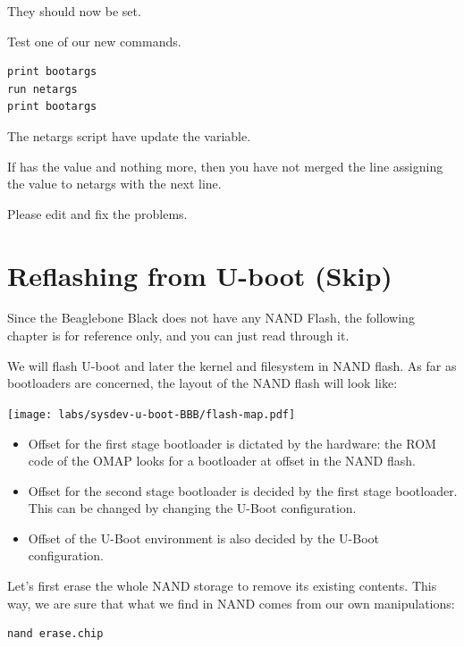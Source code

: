 They should now be set.

Test one of our new commands.

\begin{verbatim}
print bootargs
run netargs
print bootargs
\end{verbatim}

The netargs script have update the  variable.

If  has the value  and nothing
more, then you have not merged the line assigning the value to netargs with the next line.

Please edit  and fix the problems.

\clearpage
\section{Reflashing from U-boot (Skip)}

Since the Beaglebone Black does not have any NAND Flash, the following
chapter is for reference only, and you can just read through it.

We will flash U-boot and later the kernel and filesystem in NAND
flash. As far as bootloaders are concerned, the layout of the NAND
flash will look like:

\begin{center}
  \texttt{[image: labs/sysdev-u-boot-BBB/flash-map.pdf]}
\end{center}

\begin{itemize}
\item Offset  for the first stage bootloader is dictated by
  the hardware: the ROM code of the OMAP looks for a bootloader at
  offset  in the NAND flash.
\item Offset  for the second stage bootloader is decided
  by the first stage bootloader. This can be changed by changing the
  U-Boot configuration.
\item Offset  of the U-Boot environment is also decided
  by the U-Boot configuration.
\end{itemize}

Let's first erase the whole NAND storage to remove its existing
contents. This way, we are sure that what we find in NAND comes from
our own manipulations:

\begin{verbatim}
nand erase.chip
\end{verbatim}

